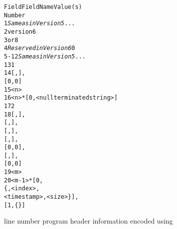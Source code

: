 \begin{figure}[h]
\begin{dwflisting}
\begin{alltt}
  Field           Field Name                      Value(s)
  Number
     1    \textit{Same as in Version 5}            ...
     2    version                         6
     3     or 8
     4    \textit{Reserved in Version 6}           0
   5-12   \textit{Same as in Version 5}            ...
    13    \HFNdirectoryformatcount{}          1
    14    \HFNdirectoryformattable{}          [\DWLNCTpath, \DWFORMstring], 
	                                          [0, 0]
    15    \HFNdirectoriescount{}               <n>
    16    \HFNdirectories{}                     <n>*[0, <null terminated string>]
    17    \HFNfilenameformatcount{}          2
    18    \HFNfilenameformattable{}          [\DWLNCTpath, \DWFORMstring],
                                          [\DWLNCTdirectoryindex, \DWFORMudata],
                                          [\DWLNCTtimestamp, \DWFORMudata],
                                          [\DWLNCTsize, \DWFORMudata],
                                          [0, 0],
                                          [\DWLNCTsource, \DWFORMstrp],
                                          [0, 0]
    19    \HFNfilenamescount{}                <m>
    20    \HFNfilenames{}                      <m-1>*[0, 
                                               \{<null terminated string>, <index>, 
                                                <timestamp>, <size>\}],
                                          [1, \{<null terminated string offset>\}]
\end{alltt}
\end{dwflisting}
\begin{centering}
\caption{\DWARFVersionV{} line number program header information \mbox{encoded} using 
		 \DWARFVersionVI}
\label{fig:V5LNCTusingV6}
\end{centering}
\end{figure}


